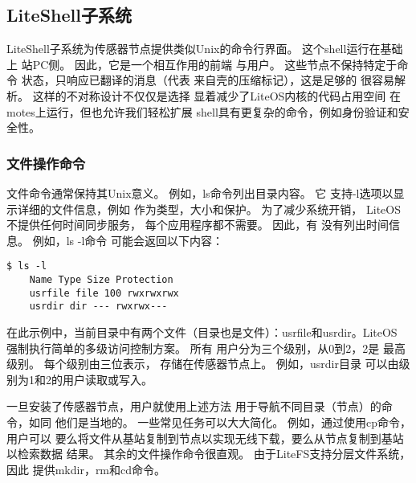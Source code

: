 \subsection{LiteShell子系统}
LiteShell子系统为传感器节点提供类似Unix的命令行界面。 这个shell运行在基础上
站PC侧。 因此，它是一个相互作用的前端
与用户。 这些节点不保持特定于命令
状态，只响应已翻译的消息（代表
来自壳的压缩标记），这是足够的
很容易解析。 这样的不对称设计不仅仅是选择
显着减少了LiteOS内核的代码占用空间
在motes上运行，但也允许我们轻松扩展
shell具有更复杂的命令，例如身份验证和安全性。

\subsubsection{文件操作命令}
文件命令通常保持其Unix意义。
例如，ls命令列出目录内容。 它
支持-l选项以显示详细的文件信息，例如
作为类型，大小和保护。 为了减少系统开销，
LiteOS不提供任何时间同步服务，
每个应用程序都不需要。 因此，有
没有列出时间信息。 例如，ls -l命令
可能会返回以下内容：
\begin{lstlisting}[language={[ANSI]C},keywordstyle=\color{blue!70},commentstyle=\color{red!50!green!50!blue!50},frame=shadowbox, rulesepcolor=\color{red!20!green!20!blue!20}]
    $ ls -l
    Name Type Size Protection
    usrfile file 100 rwxrwxrwx
    usrdir dir --- rwxrwx---
    \end{lstlisting}
    在此示例中，当前目录中有两个文件（目录也是文件）：usrfile和usrdir。LiteOS
强制执行简单的多级访问控制方案。 所有
用户分为三个级别，从0到2，2是
最高级别。 每个级别由三位表示，
存储在传感器节点上。 例如，usrdir目录
可以由级别为1和2的用户读取或写入。

一旦安装了传感器节点，用户就使用上述方法
用于导航不同目录（节点）的命令，如同
他们是当地的。 一些常见任务可以大大简化。 例如，通过使用cp命令，用户可以
要么将文件从基站复制到节点以实现无线下载，要么从节点复制到基站以检索数据
结果。 其余的文件操作命令很直观。 由于LiteFS支持分层文件系统，因此
提供mkdir，rm和cd命令。


